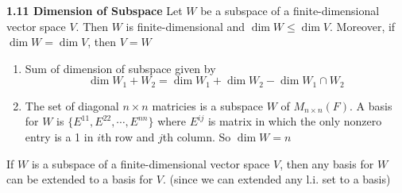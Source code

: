 \documentclass[11pt]{article}
\begin{document}
\begin{theorem*}
    \textbf{1.11 Dimension of Subspace} Let $W$ be a subspace of a finite-dimensional vector space $V$. Then $W$ is finite-dimensional and $\dim{W}\leq \dim{V}$. Moreover, if $\dim{W}=\dim{V}$, then $V=W$
    \begin{enumerate}
        \item Sum of dimension of subspace given by 
        \[
            \dim{W_1+W_2} = \dim{W_1}+\dim{W_2}-\dim{W_1\cap W_2}
        \]
        \item The set of diagonal $n\times n$ matricies is a subspace $W$ of $M_{n\times n}(F)$. A basis for $W$ is $\{E^{11}, E^{22}, \cdots, E^{nn}\}$ where $E^{ij}$ is matrix in which the only nonzero entry is a 1 in $i$th row and $j$th column. So $\dim{W}=n$
    \end{enumerate}
\end{theorem*}


\begin{corollary*}
    If $W$ is a subspace of a finite-dimensional vector space $V$, then any basis for $W$ can be extended to a basis for $V$. (since we can extended any l.i. set to a basis)
\end{corollary*}
\end{document}
